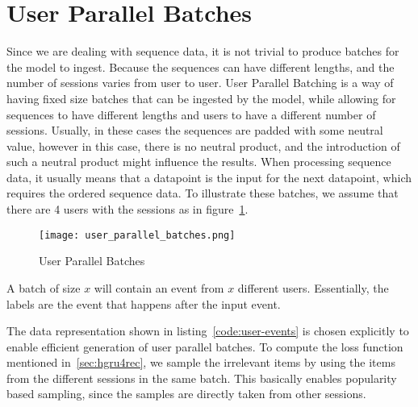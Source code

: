 \section{User Parallel Batches}
Since we are dealing with sequence data, it is not trivial to produce batches for the model to ingest.
Because the sequences can have different lengths, and the number of sessions varies from user to user.
User Parallel Batching is a way of having fixed size batches that can be ingested by the model, while allowing for sequences to have different lengths and users to have a different number of sessions.
Usually, in these cases the sequences are padded with some neutral value, however in this case, there is no neutral product, and the introduction of such a neutral product might influence the results.
When processing sequence data, it usually means that a datapoint is the input for the next datapoint, which requires the ordered sequence data.
To illustrate these batches, we assume that there are 4 users with the sessions as in figure~\ref{fig:user_parallel_batches}.
\begin{figure}[t]
	\centering
	\captionsetup{width=0.8\textwidth}
    \texttt{[image: user\_parallel\_batches.png]}
    \caption{User Parallel Batches}
    \label{fig:user_parallel_batches}
\end{figure}
A batch of size $x$ will contain an event from $x$ different users.
Essentially, the labels are the event that happens after the input event.
\par
The data representation shown in listing~\ref{code:user-events} is chosen explicitly to enable efficient generation of user parallel batches.
To compute the loss function mentioned in~\ref{sec:hgru4rec}, we sample the irrelevant items by using the items from the different sessions in the same batch.
This basically enables popularity based sampling, since the samples are directly taken from other sessions.

